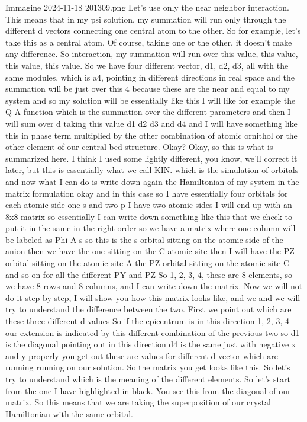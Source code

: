 \f{Immagine 2024-11-18 201309.png}
Let's use only the near neighbor interaction. This means that in my psi solution, my summation will run only through the different d vectors connecting one central atom to the other. So for example, let's take this as a central atom. Of course, taking one or the other, it doesn't make any difference. So interaction, my summation will run over this value, this value, this value, this value. So we have four different vector, d1, d2, d3, all with the same modules, which is a4, pointing in different directions in real space and the summation will be just over this 4 because these are the near and equal to my system and so my solution will be essentially like this I will like for example the Q A function which is the summation over the different parameters and then I will sum over d taking this value d1 d2 d3 and d4 and I will have something like this in phase term multiplied by the other combination of atomic ornithol or the other element of our central bed structure. Okay? Okay, so this is what is summarized here. I think I used some lightly different, you know, we'll correct it later, but this is essentially what we call KIN. which is the simulation of orbitals and now what I can do is write down again the Hamiltonian of my system in the matrix formulation okay and in this case so I have essentially four orbitals for each atomic side one s and two p I have two atomic sides I will end up with an 8x8 matrix so essentially I can write down something like this that we check to put it in the same in the right order so we have a matrix where one column will be labeled as Phi A s so this is the s-orbital sitting on the atomic side of the anion then we have the one sitting on the C atomic site then I will have the PZ orbital sitting on the atomic site A the PZ orbital sitting on the atomic site C and so on for all the different PY and PZ So 1, 2, 3, 4, these are 8 elements, so we have 8 rows and 8 columns, and I can write down the matrix. Now we will not do it step by step, I will show you how this matrix looks like, and we and we will try to understand the difference between the two.
First we point out which are these three different d values So if the epicentrum is in this direction 1, 2, 3, 4 our extension is indicated by this different combination of the previous two so d1 is the diagonal pointing out in this direction d4 is the same just with negative x and y properly you get out these are values for different d vector which are running running on our solution. So the matrix you get looks like this. So let's try to understand which is the meaning of the different elements. So let's start from the one I have highlighted in black. You see this from the diagonal of our matrix. So this means that we are taking the superposition of our crystal Hamiltonian with the same orbital.
